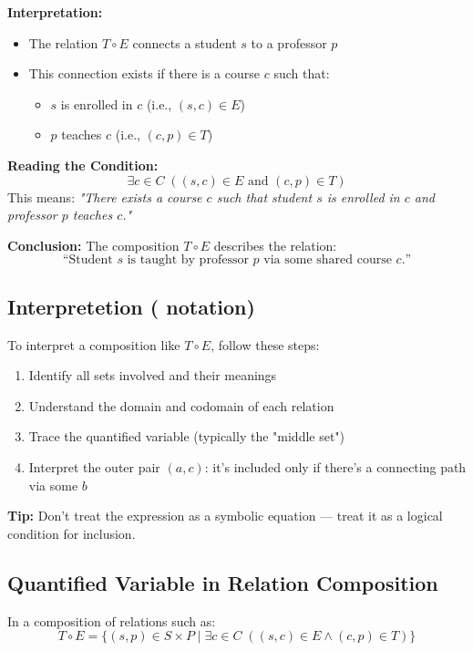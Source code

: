 \documentclass[10pt]{article}
\theoremstyle{plain}
\theoremstyle{definition}
\begin{document}
	\textbf{Interpretation:}
	\begin{itemize}
		\item The relation $T \circ E$ connects a student $s$ to a professor $p$
		\item This connection exists if there is a course $c$ such that:
		\begin{itemize}
			\item $s$ is enrolled in $c$ (i.e., $(s, c) \in E$)
			\item $p$ teaches $c$ (i.e., $(c, p) \in T$)
		\end{itemize}
	\end{itemize}
	
	\textbf{Reading the Condition:}
	\[
	\exists c \in C \; ((s, c) \in E \text{ and } (c, p) \in T)
	\]
	This means:
	\emph{"There exists a course $c$ such that student $s$ is enrolled in $c$ and professor $p$ teaches $c$."}
	
	\textbf{Conclusion:}
	The composition $T \circ E$ describes the relation:
	\[
	\text{“Student $s$ is taught by professor $p$ via some shared course $c$.”}
	\]
	
	\vspace{1em}
  \subsection*{Interpretetion ( notation)}
		To interpret a composition like $T \circ E$, follow these steps:
		\begin{enumerate}
			\item Identify all sets involved and their meanings
			\item Understand the domain and codomain of each relation
			\item Trace the quantified variable (typically the "middle set")
			\item Interpret the outer pair $(a, c)$: it's included only if there's a connecting path via some $b$
		\end{enumerate}
		\textbf{Tip:} Don't treat the expression as a symbolic equation — treat it as a logical condition for inclusion.
	\subsection*{Quantified Variable in Relation Composition}
	
	In a composition of relations such as:
	\[
	T \circ E = \{ (s, p) \in S \times P \mid \exists c \in C \; ((s, c) \in E \wedge (c, p) \in T) \}
	\]
	
\end{document}
